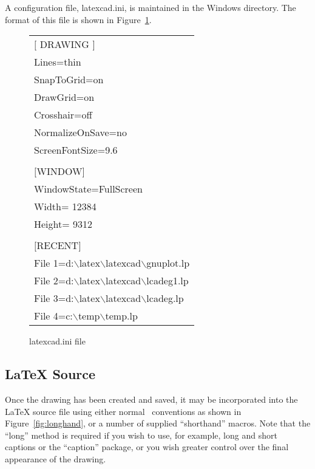 \documentclass[a4paper]{article}
\newcommand{\bs}{$\backslash$}
\begin{document}
A configuration file, latexcad.ini, is maintained in the Windows
directory. The format of this file is shown in Figure~\ref{fig:inifile}.

\begin{figure}
	\begin{center}
	\begin{tabular}{l}
		\hline
		$[$ DRAWING $]$ \\
		Lines=thin \\
		SnapToGrid=on \\
		DrawGrid=on \\
		Crosshair=off\\
		NormalizeOnSave=no \\
		ScreenFontSize=9.6\\
		\\
		$[$WINDOW$]$ \\
		WindowState=FullScreen \\
		Width= 12384 \\
		Height= 9312 \\
		\\
		$[$RECENT$]$ \\
		File 1=d:\bs latex\bs latexcad\bs gnuplot.lp \\
		File 2=d:\bs latex\bs latexcad\bs lcadeg1.lp \\
		File 3=d:\bs latex\bs latexcad\bs lcadeg.lp \\
		File 4=c:\bs temp\bs temp.lp \\
		\hline\hline
	\end{tabular}
	\caption{latexcad.ini file}
	\label{fig:inifile}
	\end{center}
\end{figure}


\subsection{ \LaTeX\/ Source } \label{sec:source}
Once the drawing has been created and saved, it may be incorporated
into the \LaTeX\/ source file using either normal \LaTeXe\ conventions
as shown in Figure~\ref{fig:longhand}, or a number of supplied 
``shorthand'' macros. Note that the ``long'' method is required if you 
wish to use, for example, long and short captions or the ``caption''
package, or you wish greater control over the final appearance of the drawing.
\end{document}
